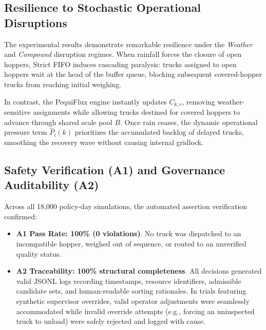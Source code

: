\documentclass[11pt,a4paper]{article}
\begin{document}
\subsection{Resilience to Stochastic Operational Disruptions}
The experimental results demonstrate remarkable resilience under the \emph{Weather} and \emph{Compound} disruption regimes. When rainfall forces the closure of open hoppers, Strict FIFO induces cascading paralysis: trucks assigned to open hoppers wait at the head of the buffer queue, blocking subsequent covered-hopper trucks from reaching initial weighing. 

In contrast, the PequiFlux engine instantly updates $C_{k,r}$, removing weather-sensitive assignments while allowing trucks destined for covered hoppers to advance through shared scale pool $B$. Once rain ceases, the dynamic operational pressure term $\hat{P}_i(k)$ prioritizes the accumulated backlog of delayed trucks, smoothing the recovery wave without causing internal gridlock.

\subsection{Safety Verification (A1) and Governance Auditability (A2)}
Across all 18,000 policy-day simulations, the automated assertion verification confirmed:
\begin{itemize}[leftmargin=1.2cm,itemsep=0pt,topsep=2pt]
  \item \textbf{A1 Pass Rate: 100\% (0 violations)}. No truck was dispatched to an incompatible hopper, weighed out of sequence, or routed to an unverified quality status.
  \item \textbf{A2 Traceability: 100\% structural completeness}. All decisions generated valid JSONL logs recording timestamps, resource identifiers, admissible candidate sets, and human-readable sorting rationales. In trials featuring synthetic supervisor overrides, valid operator adjustments were seamlessly accommodated while invalid override attempts (e.g., forcing an uninspected truck to unload) were safely rejected and logged with cause.
\end{itemize}
\end{document}
